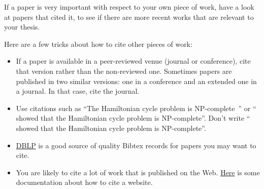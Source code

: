 If a paper is very important with respect to your own piece of work, have a look at papers
that cited it, to see if there are more recent works that are relevant to your thesis.

Here are a few tricks about how to cite other pieces of work:
\begin{itemize}
  \item If a paper is available in a peer-reviewed venue (journal or conference), cite that
  version rather than the non-reviewed one. Sometimes papers are published in two similar
  versions: one in a conference and an extended one in a journal. In that case, cite the
  journal.
  \item Use citations such as ``The Hamiltonian cycle problem is
  NP-complete~\cite{DBLP:conf/coco/Karp72}'' or ``\textcite{DBLP:conf/coco/Karp72} showed
  that the Hamiltonian cycle problem is NP-complete''. Don't write
  ``\cite{DBLP:conf/coco/Karp72} showed that the Hamiltonian cycle problem is NP-complete''.
  \item \href{https://dblp.org}{DBLP} is a good source of quality Bibtex records for papers
  you may want to cite.
  \item You are likely to cite a lot of work that is published on the Web.
  \href{https://bibtex.eu/faq/how-can-i-use-bibtex-to-cite-a-website/}{Here} is some
  documentation about how to cite a website.
\end{itemize}
